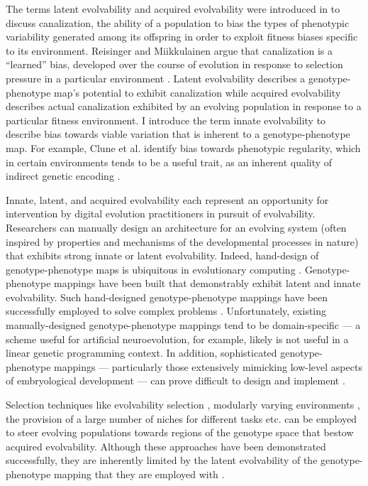 The terms latent evolvability and acquired evolvability were introduced in \cite{reisinger2005towards} to discuss canalization, the ability of a population to bias the types of phenotypic variability generated among its offspring in order to exploit fitness biases specific to its environment.
Reisinger and Miikkulainen argue that canalization is a ``learned'' bias, developed over the course of evolution in response to selection pressure in a particular environment \cite{reisinger2005towards}.
Latent evolvability describes a genotype-phenotype map's potential to exhibit canalization while acquired evolvability describes actual canalization exhibited by an evolving population in response to a particular fitness environment.
I introduce the term innate evolvability to describe bias towards viable variation that is inherent to a genotype-phenotype map.
For example, Clune et al. identify bias towards phenotypic regularity, which in certain environments tends to be a useful trait, as an inherent quality of indirect genetic encoding \cite{clune2008generative}.

Innate, latent, and acquired evolvability each represent an opportunity for intervention by digital evolution practitioners in pursuit of evolvability.
Researchers can manually design an architecture for an evolving system (often inspired by properties and mechanisms of the developmental processes in nature) that exhibits strong innate \cite{clune2011performance} or latent \cite{reisinger2005towards} evolvability.
Indeed, hand-design of genotype-phenotype maps is ubiquitous in evolutionary computing \cite{wagner1996perspective}.
Genotype-phenotype mappings have been built that demonstrably exhibit latent \cite{reisinger2007acquiring} and innate \cite{stanley2009hypercube, clune2011performance} evolvability.
Such hand-designed genotype-phenotype mappings have been successfully employed to solve complex problems \cite{woolley2010evolving, cheney2013unshackling}.
Unfortunately, existing manually-designed genotype-phenotype mappings tend to be domain-specific --- a scheme useful for artificial neuroevolution, for example, likely is not useful in a linear genetic programming context.
In addition, sophisticated genotype-phenotype mappings --- particularly those extensively mimicking low-level aspects of embryological development --- can prove difficult to design and implement \cite[p 223]{downing2015intelligence}.

Selection techniques like evolvability selection \cite{mengistu2016evolvability}, modularly varying environments \cite{kashtan2005spontaneous}, the provision of a large number of niches for different tasks \cite{nguyen2015innovation} etc. can be employed to steer evolving populations towards regions of the genotype space that bestow acquired evolvability.
Although these approaches have been demonstrated successfully, they are inherently limited by the latent evolvability of the genotype-phenotype mapping that they are employed with \cite{reisinger2005towards}.

